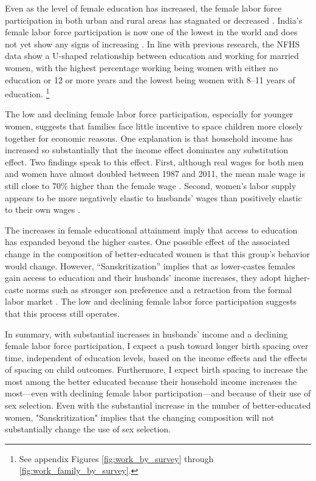 Even as the level of female education has increased, the female labor force 
participation in both urban and rural areas has stagnated or decreased
\citep{Klasen2015,Fletcher2017,Afridi2018,Bhargava2018,Chatterjee2018,Bhargava2019}.
India's female labor force participation is now one of the lowest in the world  
and does not yet show any signs of increasing \citep{Klasen2015,Chatterjee2018}.
In line with previous research, the NFHS data show a U-shaped relationship between 
education and working for married women, with the highest percentage working being women 
with either no education or 12 or more years and the lowest being women with 8--11 years 
of education.%
\footnote{
See appendix Figures \ref{fig:work_by_survey} through \ref{fig:work_family_by_survey}. 
}

The low and declining female labor force participation, especially for younger women, 
suggests that families face little incentive to space children more closely 
together for economic reasons.
One explanation is that household income has increased so substantially that the income 
effect dominates any substitution effect.
Two findings speak to this effect.
First, although real wages for both men and women have almost doubled between 1987 and 
2011, the mean male wage is still close to 70\% higher than the female wage 
\citep{Klasen2015,Bhargava2018}.
Second, women’s labor supply appears to be more negatively elastic to husbands' 
wages than positively elastic to their own wages \citep{Bhargava2018}.


The increases in female educational attainment imply that access to education has 
expanded beyond the higher castes. 
One possible effect of the associated change in the composition of better-educated women 
is that this group's behavior would change.
However, ``Sanskritization'' implies that as lower-castes females gain access to 
education and their husbands' income increases, they adopt higher-caste 
norms such as stronger son preference and a retraction from the formal labor 
market \citep{Srinivas1956,Chen1995,Abraham2013,Chatterjee2018}.
The low and declining female labor force participation suggests that this process still operates.


In summary, with substantial increases in husbands' income and a declining female labor 
force participation, I expect a push toward longer birth spacing over time, independent
of education levels, based on the income effects and the effects of spacing
on child outcomes.
Furthermore, I expect birth spacing to increase the most among the better educated 
because their household income increases the most---even with declining female labor 
participation---and because of their use of sex selection.
Even with the substantial increase in the number of better-educated women, 
"Sanskritization" implies that the changing composition will not substantially change 
the use of sex selection.






